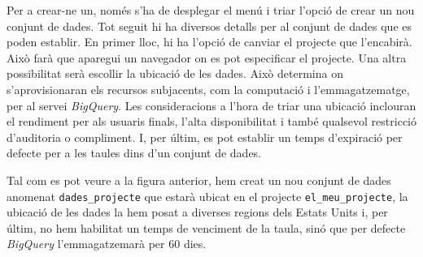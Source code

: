 \documentclass[12pt,longbibliography]{article}
\theoremstyle{definition}
\theoremstyle{remark}
\begin{document}
Per a crear-ne un, només s'ha de desplegar el menú i triar l'opció de crear un nou conjunt de dades. Tot seguit hi ha diversos detalls per al conjunt de dades que es poden establir. En primer lloc, hi ha l'opció de canviar el projecte que l'encabirà. Això farà que aparegui un navegador on es pot especificar el projecte. Una altra possibilitat serà escollir la ubicació de les dades. Això determina on s'aprovisionaran els recursos subjacents, com la computació i l'emmagatzematge, per al servei \textit{BigQuery}. Les consideracions a l'hora de triar una ubicació inclouran el rendiment per als usuaris finals, l'alta disponibilitat i també qualsevol restricció d'auditoria o compliment. I, per últim, es pot establir un temps d'expiració per defecte per a les taules dins d'un conjunt de dades.

\vspace{2mm}

\par
{}%
\hfill
{}%
\par

\vspace{2mm}

Tal com es pot veure a la figura anterior, hem creat un nou conjunt de dades anomenat \verb|dades_projecte| que estarà ubicat en el projecte \verb|el_meu_projecte|, la ubicació de les dades la hem posat a diverses regions dels Estats Units i, per últim, no hem habilitat un temps de venciment de la taula, sinó que per defecte \textit{BigQuery} l'emmagatzemarà per 60 dies.
\end{document}
